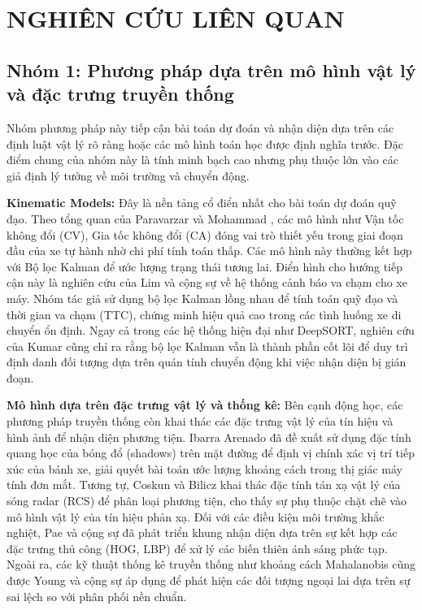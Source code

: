 \section{NGHIÊN CỨU LIÊN QUAN}

	
	\subsection{Nhóm 1: Phương pháp dựa trên mô hình vật lý và đặc trưng truyền thống}

	Nhóm phương pháp này tiếp cận bài toán dự đoán và nhận diện dựa trên các định luật vật lý rõ ràng hoặc các mô hình toán học được định nghĩa trước. Đặc điểm chung của nhóm này là tính minh bạch cao nhưng phụ thuộc lớn vào các giả định lý tưởng về môi trường và chuyển động.

	\textbf{Kinematic Models:}
	Đây là nền tảng cổ điển nhất cho bài toán dự đoán quỹ đạo. Theo tổng quan của Paravarzar và Mohammad \cite{Paravarzar2020}, các mô hình như Vận tốc không đổi (CV), Gia tốc không đổi (CA) đóng vai trò thiết yếu trong giai đoạn đầu của xe tự hành nhờ chi phí tính toán thấp. Các mô hình này thường kết hợp với Bộ lọc Kalman để ước lượng trạng thái tương lai.
	Điển hình cho hướng tiếp cận này là nghiên cứu của Lim và cộng sự \cite{Lim2018} về hệ thống cảnh báo va chạm cho xe máy. Nhóm tác giả sử dụng bộ lọc Kalman lồng nhau để tính toán quỹ đạo và thời gian va chạm (TTC), chứng minh hiệu quả cao trong các tình huống xe di chuyển ổn định. Ngay cả trong các hệ thống hiện đại như DeepSORT, nghiên cứu của Kumar \cite{Kumar2023} cũng chỉ ra rằng bộ lọc Kalman vẫn là thành phần cốt lõi để duy trì định danh đối tượng dựa trên quán tính chuyển động khi việc nhận diện bị gián đoạn.

	\textbf{Mô hình dựa trên đặc trưng vật lý và thống kê:}
	Bên cạnh động học, các phương pháp truyền thống còn khai thác các đặc trưng vật lý của tín hiệu và hình ảnh để nhận diện phương tiện. Ibarra Arenado \cite{Ibarra2016} đã đề xuất sử dụng đặc tính quang học của bóng đổ (shadows) trên mặt đường để định vị chính xác vị trí tiếp xúc của bánh xe, giải quyết bài toán ước lượng khoảng cách trong thị giác máy tính đơn mắt. Tương tự, Coskun và Bilicz \cite{Coskun2024} khai thác đặc tính tán xạ vật lý của sóng radar (RCS) để phân loại phương tiện, cho thấy sự phụ thuộc chặt chẽ vào mô hình vật lý của tín hiệu phản xạ.
	Đối với các điều kiện môi trường khắc nghiệt, Pae và cộng sự \cite{Pae2018} đã phát triển khung nhận diện dựa trên sự kết hợp các đặc trưng thủ công (HOG, LBP) để xử lý các biến thiên ánh sáng phức tạp. Ngoài ra, các kỹ thuật thống kê truyền thống như khoảng cách Mahalanobis cũng được Young và cộng sự \cite{Young2016} áp dụng để phát hiện các đối tượng ngoại lai dựa trên sự sai lệch so với phân phối nền chuẩn.

